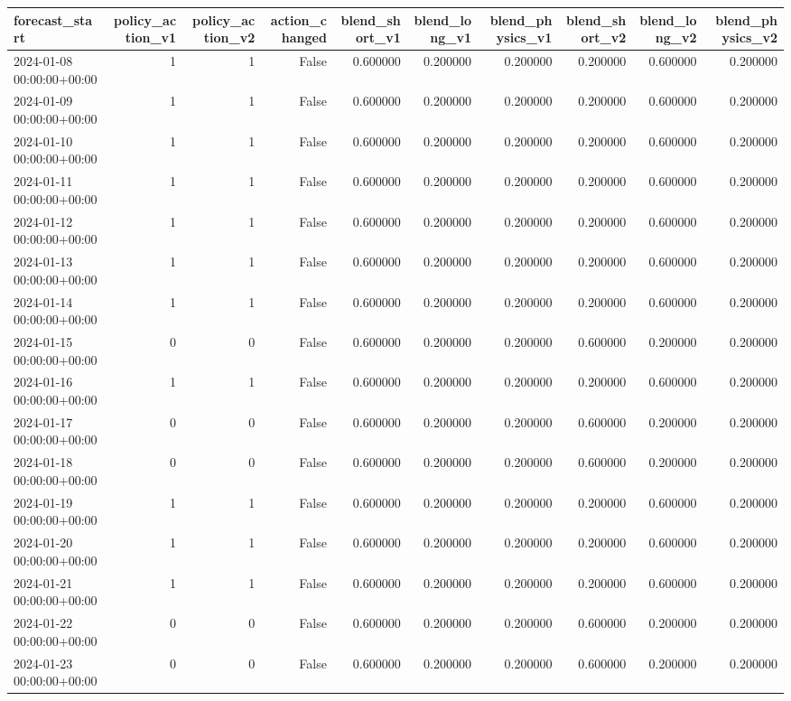 \begin{tabular}{lrrrrrrrrr}
\toprule
forecast_start & policy_action_v1 & policy_action_v2 & action_changed & blend_short_v1 & blend_long_v1 & blend_physics_v1 & blend_short_v2 & blend_long_v2 & blend_physics_v2 \\
\midrule
2024-01-08 00:00:00+00:00 & 1 & 1 & False & 0.600000 & 0.200000 & 0.200000 & 0.200000 & 0.600000 & 0.200000 \\
2024-01-09 00:00:00+00:00 & 1 & 1 & False & 0.600000 & 0.200000 & 0.200000 & 0.200000 & 0.600000 & 0.200000 \\
2024-01-10 00:00:00+00:00 & 1 & 1 & False & 0.600000 & 0.200000 & 0.200000 & 0.200000 & 0.600000 & 0.200000 \\
2024-01-11 00:00:00+00:00 & 1 & 1 & False & 0.600000 & 0.200000 & 0.200000 & 0.200000 & 0.600000 & 0.200000 \\
2024-01-12 00:00:00+00:00 & 1 & 1 & False & 0.600000 & 0.200000 & 0.200000 & 0.200000 & 0.600000 & 0.200000 \\
2024-01-13 00:00:00+00:00 & 1 & 1 & False & 0.600000 & 0.200000 & 0.200000 & 0.200000 & 0.600000 & 0.200000 \\
2024-01-14 00:00:00+00:00 & 1 & 1 & False & 0.600000 & 0.200000 & 0.200000 & 0.200000 & 0.600000 & 0.200000 \\
2024-01-15 00:00:00+00:00 & 0 & 0 & False & 0.600000 & 0.200000 & 0.200000 & 0.600000 & 0.200000 & 0.200000 \\
2024-01-16 00:00:00+00:00 & 1 & 1 & False & 0.600000 & 0.200000 & 0.200000 & 0.200000 & 0.600000 & 0.200000 \\
2024-01-17 00:00:00+00:00 & 0 & 0 & False & 0.600000 & 0.200000 & 0.200000 & 0.600000 & 0.200000 & 0.200000 \\
2024-01-18 00:00:00+00:00 & 0 & 0 & False & 0.600000 & 0.200000 & 0.200000 & 0.600000 & 0.200000 & 0.200000 \\
2024-01-19 00:00:00+00:00 & 1 & 1 & False & 0.600000 & 0.200000 & 0.200000 & 0.200000 & 0.600000 & 0.200000 \\
2024-01-20 00:00:00+00:00 & 1 & 1 & False & 0.600000 & 0.200000 & 0.200000 & 0.200000 & 0.600000 & 0.200000 \\
2024-01-21 00:00:00+00:00 & 1 & 1 & False & 0.600000 & 0.200000 & 0.200000 & 0.200000 & 0.600000 & 0.200000 \\
2024-01-22 00:00:00+00:00 & 0 & 0 & False & 0.600000 & 0.200000 & 0.200000 & 0.600000 & 0.200000 & 0.200000 \\
2024-01-23 00:00:00+00:00 & 0 & 0 & False & 0.600000 & 0.200000 & 0.200000 & 0.600000 & 0.200000 & 0.200000 \\

\end{tabular}
